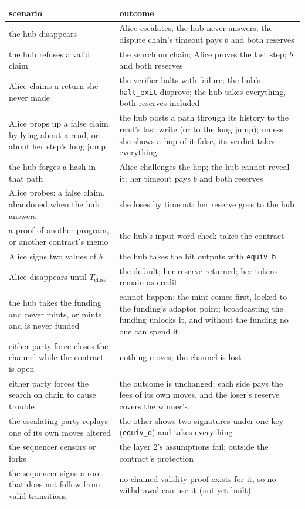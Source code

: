 \documentclass[11pt]{article}
\newcommand{\Tc}{T_{\mathrm{close}}}
\newcommand{\tx}[1]{\texttt{#1}}
\begin{document}
\begin{center}
\small
\begin{tabularx}{\linewidth}{p{55mm}L}
\toprule
scenario & outcome \\
\midrule
the hub disappears & Alice escalates; the hub never answers; the dispute chain's timeout pays $b$ and both reserves \\
the hub refuses a valid claim & the search on chain; Alice proves the last step; $b$ and both reserves \\
Alice claims a return she never made & the verifier halts with failure; the hub's \tx{halt\_exit} disprove; the hub takes everything, both reserves included \\
Alice props up a false claim by lying about a read, or about her step's long jump & the hub posts a path through its history to the read's last write (or to the long jump); unless she shows a hop of it false, its verdict takes everything \\
the hub forges a hash in that path & Alice challenges the hop; the hub cannot reveal it; her timeout pays $b$ and both reserves \\
Alice probes: a false claim, abandoned when the hub answers & she loses by timeout: her reserve goes to the hub \\
a proof of another program, or another contract's memo & the hub's input-word check takes the contract \\
Alice signs two values of $b$ & the hub takes the bit outputs with \tx{equiv\_b} \\
Alice disappears until $\Tc$ & the default; her reserve returned; her tokens remain as credit \\
the hub takes the funding and never mints, or mints and is never funded & cannot happen: the mint comes first, locked to the funding's adaptor point; broadcasting the funding unlocks it, and without the funding no one can spend it \\
either party force-closes the channel while the contract is open & nothing moves; the channel is lost \\
either party forces the search on chain to cause trouble & the outcome is unchanged; each side pays the fees of its own moves, and the loser's reserve covers the winner's \\
the escalating party replays one of its own moves altered & the other shows two signatures under one key (\tx{equiv\_d}) and takes everything \\
the sequencer censors or forks & the layer 2's assumptions fail; outside the contract's protection \\
the sequencer signs a root that does not follow from valid transitions & no chained validity proof exists for it, so no withdrawal can use it (not yet built) \\
\bottomrule
\end{tabularx}
\end{center}
\end{document}
